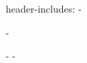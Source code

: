 header-includes: 
- \usepackage{titling}
- \usepackage{pdfpages}
- \pretitle{\begin{center}}
- \posttitle{\end{center}}